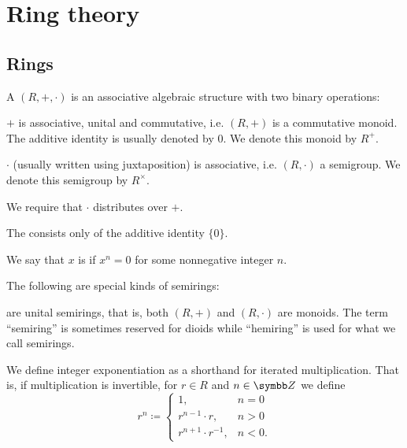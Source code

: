 \section{Ring theory}\label{sec:ring_theory}
\subsection{Rings}\label{subsec:rings}

\begin{definition}\label{def:semiring}
  A  \( (R, +, \cdot) \) is an associative algebraic structure with two binary operations:
  \begin{description}
     \( + \) is associative, unital and commutative, i.e. \( (R, +) \) is a commutative monoid. The additive identity is usually denoted by \( 0 \). We denote this monoid by \( R^+ \).

     \( \cdot \) (usually written using juxtaposition) is associative, i.e. \( (R, \cdot) \) a semigroup. We denote this semigroup by \( R^\times \).
  \end{description}

  We require that \( \cdot \) distributes over \( + \).

  The  consists only of the additive identity \( \{ 0 \} \).

  We say that \( x \) is  if \( x^n = 0 \) for some nonnegative integer \( n \).

  The following are special kinds of semirings:
  \begin{defenum}
      are unital semirings, that is, both \( (R, +) \) and \( (R, \cdot) \) are monoids. The term \enquote{semiring} is sometimes reserved for dioids while \enquote{hemiring} is used for what we call semirings.

    We define integer exponentiation as a shorthand for iterated multiplication. That is, if multiplication is invertible, for \( r \in R \) and \( n \in \Z \) we define
    \begin{equation*}
      r^n \coloneqq \begin{cases}
        1,    &n = 0 \\
        r^{n - 1} \cdot r, &n > 0 \\
        r^{n + 1} \cdot r^{-1}, &n < 0.
      \end{cases}
    \end{equation*}


\end{defenum}
\end{definition}
